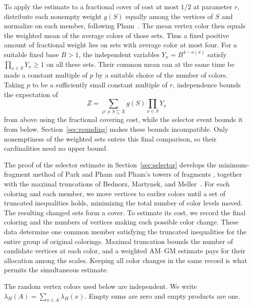 To apply the estimate to a fractional cover of cost at most $1/2$ at
parameter $r$, distribute each nonempty
weight $g(S)$ equally among the vertices of $S$ and normalize on each
member, following Pham~\cite[arXiv version~1, Section~3]{Pham2024}.
The mean vertex color then equals the weighted mean of the average
colors of those sets. Thus a fixed positive amount of fractional weight
lies on sets with average color at most four. For a suitable fixed base $B>1$,
the independent variables $Y_x=B^{4-a(x)}$ satisfy
$\prod_{x\in S}Y_x\ge1$ on all these sets. Their common mean can at the
same time be made a constant multiple of $p$ by a suitable choice of
the number of colors. Taking $p$ to be a sufficiently small constant
multiple of $r$, independence bounds the expectation of
\[
 Z=\sum_{\varnothing\ne S\subseteq X}g(S)\prod_{x\in S}Y_x
\]
from above using the fractional covering cost, while the selector event
bounds it from below. Section~\ref{sec:rounding} makes these bounds
incompatible. Only nonemptiness of the weighted sets enters this final
comparison, so their cardinalities need no upper bound.

The proof of the selector estimate in Section~\ref{sec:selector}
develops the minimum-fragment method of Park and Pham
\cite{ParkPham2024selector} and Pham's towers of fragments
\cite[arXiv version~1, Section~2]{Pham2024}, together with the maximal
truncations of Bednorz, Martynek, and Meller~\cite[Section~3.1]{BMM2022}.
For each coloring and each member, we move vertices to earlier colors
until a set of truncated inequalities holds, minimizing the total
number of color levels moved. The resulting changed sets form a cover.
To estimate its cost, we record the final coloring and the numbers of
vertices making each possible color change. These data determine one
common member satisfying the truncated inequalities for the entire
group of original colorings.
Maximal truncation bounds the number of candidate vertices at each color,
and a weighted
AM--GM estimate pays for their allocation among the scales. Keeping all
color changes in the same record is what permits the simultaneous
estimate.

The random vertex colors used below are independent.
We write $\lambda_H(A)=\sum_{x\in A}\lambda_H(x)$.
Empty sums are zero and empty products are one.
